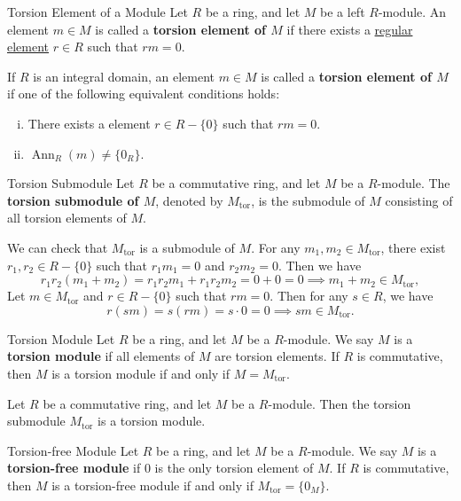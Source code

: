 \begin{definition}{Torsion Element of a Module}{}
    Let $R$ be a ring, and let $M$ be a left $R$-module. An element $m\in M$ is called a \textbf{torsion element of $M$} if there exists a \hyperref[th:zero_divisor]{regular element} $r\in R$ such that $rm=0$. 
    
    If $R$ is an integral domain, an element $m\in M$ is called a \textbf{torsion element of $M$} if one of the following equivalent conditions holds:
    \begin{enumerate}[(i)]
        \item There exists a element $r\in R-\{0\}$ such that $rm=0$.
        \item $\operatorname{Ann}_R(m)\neq \{0_R\}$.
    \end{enumerate}
\end{definition}


\begin{definition}{Torsion Submodule}{}
    Let $R$ be a commutative ring, and let $M$ be a $R$-module. The \textbf{torsion submodule of $M$}, denoted by $M_{\mathrm{tor}}$, is the submodule of $M$ consisting of all torsion elements of $M$.
\end{definition}
\begin{prf}
    We can check that $M_{\mathrm{tor}}$ is a submodule of $M$. For any $m_1, m_2\in M_{\mathrm{tor}}$, there exist $r_1, r_2\in R-\{0\}$ such that $r_1m_1=0$ and $r_2m_2=0$. Then we have
    \[
        r_1r_2(m_1+m_2)=r_1r_2m_1+r_1r_2m_2=0+0=0\implies m_1+m_2\in M_{\mathrm{tor}},
    \]
    Let $m\in M_{\mathrm{tor}}$ and $r\in R-\{0\}$ such that $rm=0$. Then for any $s\in R$, we have
    \[
        r(sm)=s(rm)=s\cdot 0=0\implies sm\in M_{\mathrm{tor}}.
    \]
\end{prf}

\begin{definition}{Torsion Module}{}
    Let $R$ be a ring, and let $M$ be a $R$-module. We say $M$ is a \textbf{torsion module} if all elements of $M$ are torsion elements. If $R$ is commutative, then $M$ is a torsion module if and only if $M=M_{\mathrm{tor}}$.
\end{definition}

\begin{example}{}{}
    Let $R$ be a commutative ring, and let $M$ be a $R$-module. Then the torsion submodule $M_{\mathrm{tor}}$ is a torsion module.
\end{example}


\begin{definition}{Torsion-free Module}{}
    Let $R$ be a ring, and let $M$ be a $R$-module. We say $M$ is a \textbf{torsion-free module} if $0$ is the only torsion element of $M$. If $R$ is commutative, then $M$ is a torsion-free module if and only if $M_{\mathrm{tor}}=\{0_M\}$.
\end{definition}

